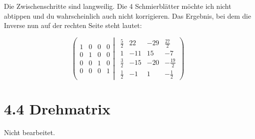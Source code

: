 \documentclass[a4paper,german,12pt,smallheadings]{scrartcl}
\begin{document}
Die Zwischenschritte sind langweilig. Die 4 Schmierblätter möchte ich nicht
abtippen und du wahrscheinlich auch nicht korrigieren. Das Ergebnis, bei dem
die Inverse nun auf der rechten Seite steht lautet:

\begin{equation*}
\left(
 \begin{matrix}
 1 & 0 & 0 & 0 \\
 0 & 1 & 0 & 0 \\
 0 & 0 & 1 & 0 \\
 0 & 0 & 0 & 1
 \end{matrix}
 \left|
  \hspace{5pt}
  \begin{matrix}
    \frac{5}{2} & 22 & -29 & \frac{27}{2} \\
     1 & -11 & 15 & -7 \\
     \frac{3}{2} & -15 & -20 & -\frac{19}{2} \\
     \frac{1}{2} & -1 & 1 & -\frac{1}{2}
  \end{matrix}
 \right)
\right.
\end{equation*}

\section*{4.4 Drehmatrix}

Nicht bearbeitet.
\end{document}
